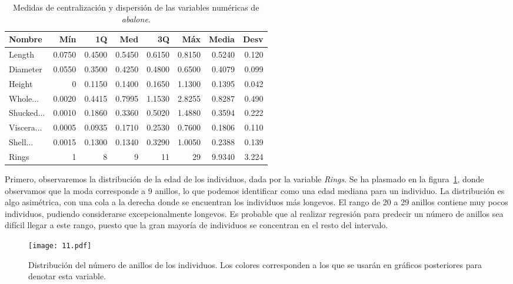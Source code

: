 \documentclass[a4paper, 11pt]{article}
\begin{document}
\begin{table}[ht]
  \caption{\label{tbl:medidas}Medidas de centralización y dispersión de las variables numéricas de \textit{abalone}.}
  
  \begin{tabular}[c]{l||r|r|r|r|r|r|r}
    Nombre & Mín & 1Q & Med & 3Q & Máx & Media & Desv \\
    \hline
    Length & 0.0750 & 0.4500 & 0.5450 & 0.6150 & 0.8150 & 0.5240 & 0.120 \\
    Diameter & 0.0550 & 0.3500 & 0.4250 & 0.4800 & 0.6500 & 0.4079 & 0.099 \\
    Height & 0 & 0.1150 & 0.1400 & 0.1650 & 1.1300 & 0.1395 & 0.042 \\
    Whole... & 0.0020 & 0.4415 & 0.7995 & 1.1530 & 2.8255 & 0.8287 & 0.490 \\
    Shucked... & 0.0010 & 0.1860 & 0.3360 & 0.5020 & 1.4880 & 0.3594 & 0.222 \\
    Viscera... & 0.0005 & 0.0935 & 0.1710 & 0.2530 & 0.7600 & 0.1806 & 0.110 \\
    Shell... & 0.0015 & 0.1300 & 0.1340 & 0.3290 & 1.0050 & 0.2388 & 0.139 \\
    Rings & 1 & 8 & 9 & 11 & 29 & 9.9340 & 3.224 
  \end{tabular}
\end{table}

Primero, observaremos la distribución de la edad de los individuos, dada por la variable \textit{Rings}. Se ha plasmado en la figura~\ref{fig:rings}, donde observamos que la moda corresponde a 9 anillos, lo que podemos identificar como una edad mediana para un individuo. La distribución es algo asimétrica, con una cola a la derecha donde se encuentran los individuos más longevos. El rango de 20 a 29 anillos contiene muy pocos individuos, pudiendo considerarse excepcionalmente longevos. Es probable que al realizar regresión para predecir un número de anillos sea difícil llegar a este rango, puesto que la gran mayoría de individuos se concentran en el resto del intervalo.

\begin{figure}[ht]
  \texttt{[image: 11.pdf]}
  \caption{\label{fig:rings}Distribución del número de anillos de los individuos. Los colores corresponden a los que se usarán en gráficos posteriores para denotar esta variable.}
  
\end{figure}
\end{document}
